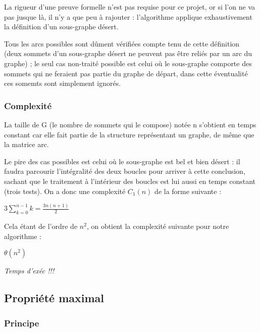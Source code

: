 La rigueur d'une preuve formelle n'est pas requise pour ce projet, or si l'on ne va  pas jusque là, il n'y a que peu à rajouter : l'algorithme applique exhaustivement la définition d'un sous-graphe désert. 

Tous les arcs  possibles sont dûment vérifiées compte tenu de cette définition (deux sommets d'un sous-graphe désert ne peuvent pas être reliés par un arc du graphe) ; le seul cas non-traité possible est celui où le sous-graphe comporte des sommets qui ne feraient pas partie du graphe de départ, dans cette éventualité ces somemts sont simplement ignorés. 

\subsubsection{Complexité}

La taille de G (le nombre de sommets qui le compose) notée n s'obtient en temps constant car elle fait partie de la structure représentant un graphe, de même que la matrice arc. 

Le pire des cas possibles est celui où le sous-graphe est bel et bien désert : il faudra parcourir l'intégralité des deux boucles pour arriver à cette conclusion, sachant que le traitement à l'intérieur des boucles est lui aussi en temps constant (trois tests). On a donc une complexité $C_1(n)$ de la forme suivante :

$3\sum\limits_{k=0}^{n-1} k = \frac{3n(n+1)}{2}$

Cela étant de l'ordre de $n^2$, on obtient la complexité suivante pour notre algorithme : 

$\theta(n^2)$

\emph{Temps d'exéc !!!} 

\subsection{Propriété \og maximal \fg}

\subsubsection{Principe}

